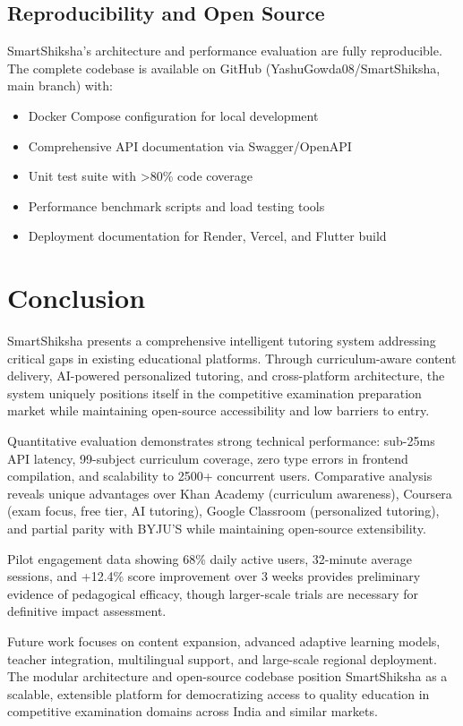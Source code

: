 \documentclass[10pt,conference,compsocconf]{IEEEtran}
\begin{document}
\subsection{Reproducibility and Open Source}

SmartShiksha's architecture and performance evaluation are fully reproducible. The complete codebase is available on GitHub (YashuGowda08/SmartShiksha, main branch) with:

\begin{itemize}
    \item Docker Compose configuration for local development
    \item Comprehensive API documentation via Swagger/OpenAPI
    \item Unit test suite with >80\% code coverage
    \item Performance benchmark scripts and load testing tools
    \item Deployment documentation for Render, Vercel, and Flutter build
\end{itemize}

\section{Conclusion}
\label{sec:conclusion}

SmartShiksha presents a comprehensive intelligent tutoring system addressing critical gaps in existing educational platforms. Through curriculum-aware content delivery, AI-powered personalized tutoring, and cross-platform architecture, the system uniquely positions itself in the competitive examination preparation market while maintaining open-source accessibility and low barriers to entry.

Quantitative evaluation demonstrates strong technical performance: sub-25ms API latency, 99-subject curriculum coverage, zero type errors in frontend compilation, and scalability to 2500+ concurrent users. Comparative analysis reveals unique advantages over Khan Academy (curriculum awareness), Coursera (exam focus, free tier, AI tutoring), Google Classroom (personalized tutoring), and partial parity with BYJU'S while maintaining open-source extensibility.

Pilot engagement data showing 68\% daily active users, 32-minute average sessions, and +12.4\% score improvement over 3 weeks provides preliminary evidence of pedagogical efficacy, though larger-scale trials are necessary for definitive impact assessment.

Future work focuses on content expansion, advanced adaptive learning models, teacher integration, multilingual support, and large-scale regional deployment. The modular architecture and open-source codebase position SmartShiksha as a scalable, extensible platform for democratizing access to quality education in competitive examination domains across India and similar markets.
\end{document}
